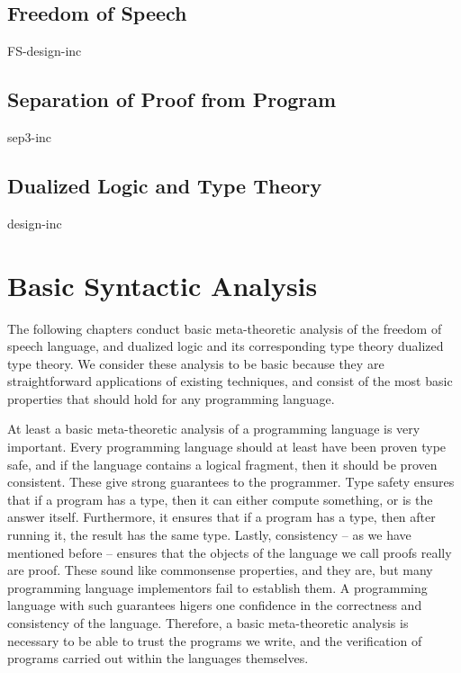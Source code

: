 \documentclass[phd,appendix,dedicationpage,ackpage,epigraphpage]{uithesis}
\begin{document}
\chapter{Freedom of Speech}
\label{chap:freedom_of_speech}
{FS-design-inc}

\chapter{Separation of Proof from Program}
\label{chap:separation_of_proof_from_program}
{sep3-inc}

\chapter{Dualized Logic and Type Theory}
\label{chap:dualized_type_theory_de}
{design-inc}

\part{Basic Syntactic Analysis}
\label{part:basic-analysis}
The following chapters conduct basic meta-theoretic analysis of the
freedom of speech language, and dualized logic and its corresponding
type theory dualized type theory.  We consider these analysis to be
basic because they are straightforward applications of existing
techniques, and consist of the most basic properties that should hold
for any programming language.

At least a basic meta-theoretic analysis of a programming language is
very important.  Every programming language should at least have been
proven type safe, and if the language contains a logical fragment,
then it should be proven consistent.  These give strong guarantees to
the programmer.  Type safety ensures that if a program has a type,
then it can either compute something, or is the answer itself.
Furthermore, it ensures that if a program has a type, then after
running it, the result has the same type.  Lastly, consistency -- as
we have mentioned before -- ensures that the objects of the language
we call proofs really are proof.  These sound like commonsense
properties, and they are, but many programming language implementors
fail to establish them.  A programming language with such guarantees
higers one confidence in the correctness and consistency of the
language.  Therefore, a basic meta-theoretic analysis is necessary to
be able to trust the programs we write, and the verification of
programs carried out within the languages themselves.
\end{document}
